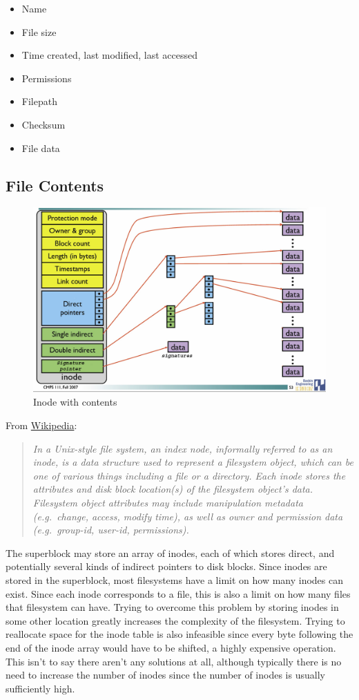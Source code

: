 \begin{itemize}
\tightlist
  \item Name
  \item File size
  \item Time created, last modified, last accessed
  \item Permissions
  \item Filepath
  \item Checksum
  \item File data
\end{itemize}

\subsection{File Contents}

\begin{figure}[htbp]
\centering
\includegraphics[width=.8\textwidth]{filesystems/images/inode_with_signatures.jpg}
\caption{Inode with contents}
\end{figure}

From \href{http://en.wikipedia.org/wiki/Inode}{Wikipedia}:

\begin{quote}
  \emph{In a Unix-style file system, an index node, informally referred to as an inode, is a data structure used to represent a filesystem object, which can be one of various things including a file or a directory.
    Each inode stores the attributes and disk block location(s) of the filesystem object's data.
    Filesystem object attributes may include manipulation metadata (e.g.~change, access, modify time), as well as owner and permission data (e.g.~group-id, user-id, permissions).}
\end{quote}

The superblock may store an array of inodes, each of which stores direct, and potentially several kinds of indirect pointers to disk blocks.
Since inodes are stored in the superblock, most filesystems have a limit on how many inodes can exist.
Since each inode corresponds to a file, this is also a limit on how many files that filesystem can have.
Trying to overcome this problem by storing inodes in some other location greatly increases the complexity of the filesystem.
Trying to reallocate space for the inode table is also infeasible since every byte following the end of the inode array would have to be shifted, a highly expensive operation.
This isn't to say there aren't any solutions at all, although typically there is no need to increase the number of inodes since the number of inodes is usually sufficiently high.

